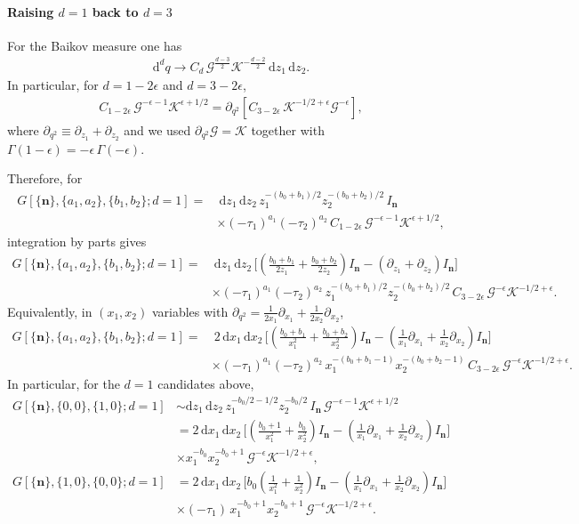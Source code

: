 \documentclass[a4paper,12pt]{article}
\newcommand{\n}{\nonumber}
\def\di{{\mathrm{d}}}
\def\ep{\epsilon}
\newcommand{\mG}{\mathcal{G}}
\newcommand{\mK}{\mathcal{K}}
\def\to{\rightarrow}
\begin{document}
\paragraph{Raising $d=1$ back to $d=3$}
For the Baikov measure one has
\begin{align}
	\di^d q \to C_d\,\mG^{\frac{d-3}{2}}\mK^{-\frac{d-2}{2}}\,\di z_1\,\di z_2.
\end{align}
In particular, for $d=1-2\ep$ and $d=3-2\ep$,
\begin{align}
	C_{1-2\ep}\,\mG^{-\ep-1}\mK^{\ep+1/2}
	= \partial_{q^2}\!\left[C_{3-2\ep}\,\mK^{-1/2+\ep}\mG^{-\ep}\right],
\end{align}
where $\partial_{q^2}\equiv\partial_{z_1}+\partial_{z_2}$ and we used $\partial_{q^2}\mG=\mK$ together with $\Gamma(1-\ep)=-\ep\,\Gamma(-\ep)$.

Therefore, for
\begin{align}
	G[\{\bm n\},\{a_1,a_2\},\{b_1,b_2\};d=1]
	=&~\di z_1\,\di z_2\,z_1^{-(b_0+b_1)/2}z_2^{-(b_0+b_2)/2}\,I_{\bm n}\,\n\\
	&\times (-\tau_1)^{a_1}(-\tau_2)^{a_2}\,C_{1-2\ep}\,\mG^{-\ep-1}\mK^{\ep+1/2},
\end{align}
integration by parts gives
\begin{align}
	G[\{\bm n\},\{a_1,a_2\},\{b_1,b_2\};d=1]
	=&~\di z_1\,\di z_2\,\Bigg[\left(\frac{b_0+b_1}{2z_1}+\frac{b_0+b_2}{2z_2}\right)I_{\bm n}
	-\left(\partial_{z_1}+\partial_{z_2}\right)I_{\bm n}\Bigg] \n\\
	&\times (-\tau_1)^{a_1}(-\tau_2)^{a_2}\,z_1^{-(b_0+b_1)/2}z_2^{-(b_0+b_2)/2}\,
	C_{3-2\ep}\,\mG^{-\ep}\mK^{-1/2+\ep}.
\end{align}
Equivalently, in $(x_1,x_2)$ variables with $\partial_{q^2}=\frac{1}{2x_1}\partial_{x_1}+\frac{1}{2x_2}\partial_{x_2}$,
\begin{align}
	G[\{\bm n\},\{a_1,a_2\},\{b_1,b_2\};d=1]
	=&~2\,\di x_1\,\di x_2\,\Bigg[\left(\frac{b_0+b_1}{x_1^2}+\frac{b_0+b_2}{x_2^2}\right)I_{\bm n}
	-\left(\frac{1}{x_1}\partial_{x_1}+\frac{1}{x_2}\partial_{x_2}\right)I_{\bm n}\Bigg] \n\\
	&\times (-\tau_1)^{a_1}(-\tau_2)^{a_2}\,x_1^{-(b_0+b_1-1)}x_2^{-(b_0+b_2-1)}\,
	C_{3-2\ep}\,\mG^{-\ep}\mK^{-1/2+\ep}.
\end{align}
In particular, for the $d=1$ candidates above,
\begin{align}
	G[\{\bm n\},\{0,0\},\{1,0\};d=1]
	&\sim \di z_1\,\di z_2\,z_1^{-b_0/2-1/2}z_2^{-b_0/2}\,I_{\bm n}\,\mG^{-\ep-1}\mK^{\ep+1/2} \n\\
	&=2\,\di x_1\,\di x_2\,\Bigg[\left(\frac{b_{0}+1}{x_1^2}+\frac{b_{0}}{x_2^2}\right)I_{\bm n}
	-\left(\frac{1}{x_1}\partial_{x_1}+\frac{1}{x_2}\partial_{x_2}\right)I_{\bm n}\Bigg]\n\\
	&\times x_1^{-b_0}x_2^{-b_0+1}\,\mG^{-\ep}\mK^{-1/2+\ep}, \n\\
	G[\{\bm n\},\{1,0\},\{0,0\};d=1]
	&=2\,\di x_1\,\di x_2\,\Bigg[b_0\left(\frac{1}{x_1^2}+\frac{1}{x_2^2}\right)I_{\bm n}
	-\left(\frac{1}{x_1}\partial_{x_1}+\frac{1}{x_2}\partial_{x_2}\right)I_{\bm n}\Bigg]\n\\
	&\times (-\tau_1)\,x_1^{-b_0+1}x_2^{-b_0+1}\,\mG^{-\ep}\mK^{-1/2+\ep}.
\end{align}
\end{document}
